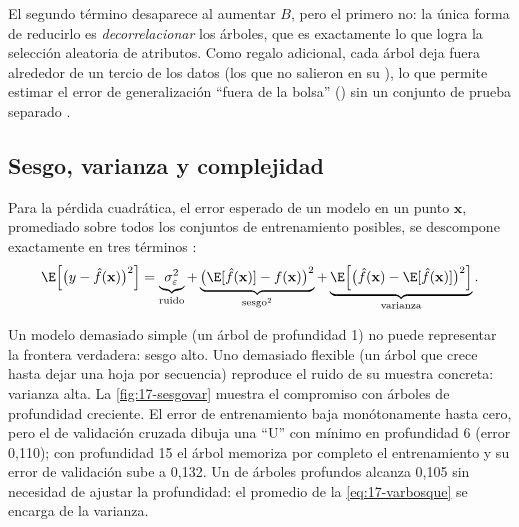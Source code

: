 \begin{simbolos}
\end{simbolos}

El segundo término desaparece al aumentar $B$, pero el primero no: la única forma de reducirlo es \emph{decorrelacionar} los árboles, que es exactamente lo que logra la selección aleatoria de atributos. Como regalo adicional, cada árbol deja fuera alrededor de un tercio de los datos (los que no salieron en su ), lo que permite estimar el error de generalización ``fuera de la bolsa'' () sin un conjunto de prueba separado \parencite{c17-breiman2001}.

\subsection{Sesgo, varianza y complejidad}

Para la pérdida cuadrática, el error esperado de un modelo en un punto $\mathbf{x}$, promediado sobre todos los conjuntos de entrenamiento posibles, se descompone exactamente en tres términos \parencite{c17-hastie2009}:
\begin{equation}\label{eq:17-sesgovar}
\E\Big[\big(y-\hat f(\mathbf{x})\big)^2\Big] = \underbrace{\sigma_\varepsilon^2}_{\text{ruido}} + \underbrace{\big(\E[\hat f(\mathbf{x})]-f(\mathbf{x})\big)^2}_{\text{sesgo}^2} + \underbrace{\E\Big[\big(\hat f(\mathbf{x})-\E[\hat f(\mathbf{x})]\big)^2\Big]}_{\text{varianza}}.
\end{equation}

\begin{simbolos}
\end{simbolos}

Un modelo demasiado simple (un árbol de profundidad 1) no puede representar la frontera verdadera: sesgo alto. Uno demasiado flexible (un árbol que crece hasta dejar una hoja por secuencia) reproduce el ruido de su muestra concreta: varianza alta. La \cref{fig:17-sesgovar} muestra el compromiso con árboles de profundidad creciente. El error de entrenamiento baja monótonamente hasta cero, pero el de validación cruzada dibuja una ``U'' con mínimo en profundidad 6 (error 0,110); con profundidad 15 el árbol memoriza por completo el entrenamiento y su error de validación sube a 0,132. Un  de árboles profundos alcanza 0,105 sin necesidad de ajustar la profundidad: el promedio de la \cref{eq:17-varbosque} se encarga de la varianza.

